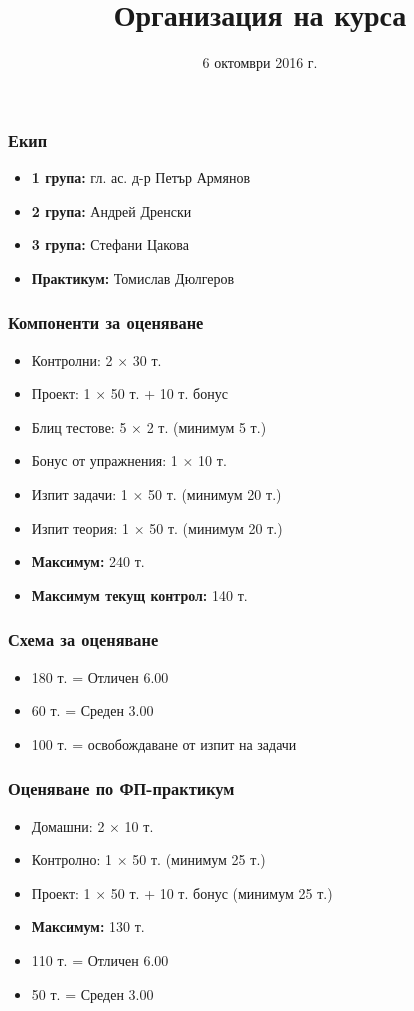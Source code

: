 \documentclass{beamer}
\title{Организация на курса}
\date{6 октомври 2016 г.}
\begin{document}
\begin{frame}
  \titlepage
\end{frame}

\begin{frame}
  \frametitle{Екип}

  \begin{itemize}
  \item \textbf{1 група:} гл. ас. д-р Петър Армянов
  \item \textbf{2 група:} Андрей Дренски
  \item \textbf{3 група:} Стефани Цакова
  \item \textbf{Практикум:} Томислав Дюлгеров
  \end{itemize}
\end{frame}

\begin{frame}
  \frametitle{Компоненти за оценяване}

  \begin{itemize}
  \item Контролни: 2 $\times$ 30 т.
  \item Проект: 1 $\times$ 50 т. + 10 т. бонус
  \item Блиц тестове: 5 $\times$ 2 т. \alert{(минимум 5 т.)}
  \item Бонус от упражнения: 1 $\times$ 10 т.
  \item Изпит задачи: 1 $\times$ 50 т. \alert{(минимум 20 т.)}
  \item Изпит теория: 1 $\times$ 50 т. \alert{(минимум 20 т.)}
  \item \textbf{Максимум:} 240 т.
  \item \textbf{Максимум текущ контрол:} 140 т.
  \end{itemize}
\end{frame}

\begin{frame}
  \frametitle{Схема за оценяване}

  \begin{itemize}
  \item 180 т. = Отличен 6.00
  \item 60 т. = Среден 3.00
  \item 100 т. = освобождаване от изпит на задачи
  \end{itemize}
\end{frame}

\begin{frame}
  \frametitle{Оценяване по ФП-практикум}

  \begin{itemize}
  \item Домашни: 2 $\times$ 10 т.
  \item Контролно: 1 $\times$ 50 т. \alert{(минимум 25 т.)}
  \item Проект: 1 $\times$ 50 т. + 10 т. бонус \alert{(минимум 25 т.)}
  \item \textbf{Максимум:} 130 т.
  \item 110 т. = Отличен 6.00
  \item 50 т. = Среден 3.00
  \end{itemize}
\end{frame}
\end{document}
